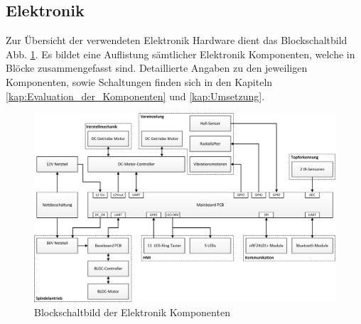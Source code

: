 \subsection{Elektronik}
Zur Übersicht der verwendeten Elektronik Hardware dient das Blockschaltbild Abb. \ref{fig:Blockschaltbild_Komponenten}. Es bildet eine Auflistung sämtlicher Elektronik Komponenten, welche in Blöcke zusammengefasst sind. Detaillierte Angaben zu den jeweiligen Komponenten, sowie Schaltungen finden sich in den Kapiteln \ref{kap:Evaluation_der_Komponenten} und \ref{kap:Umsetzung}. 


\begin{figure}[H]
	\includegraphics[width=1\textwidth]{Illustrationen/5-Konzept/Blockschaltbild_Komponenten.png}
	\caption{Blockschaltbild der Elektronik Komponenten}
	\label{fig:Blockschaltbild_Komponenten}
\end{figure}


